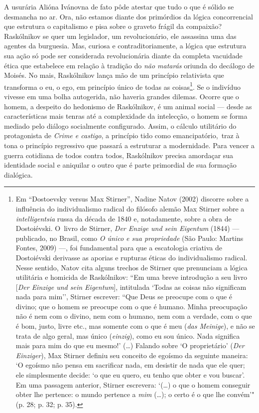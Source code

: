 A usurária Alióna Ivánovna de fato pôde atestar que tudo o que é sólido
se desmancha no ar. Ora, não estamos diante dos primórdios da lógica
concorrencial que estrutura o capitalismo e pisa sobre o graveto frágil
da compaixão? Raskólnikov se quer um legislador, um revolucionário, ele
assassina uma das agentes da burguesia. Mas, curiosa e
contraditoriamente, a lógica que estrutura sua ação só pode ser
considerada revolucionária diante da completa vacuidade ética que
estabelece em relação à tradição do \emph{não matarás} oriunda do
decálogo de Moisés. No mais, Raskólnikov lança mão de um princípio
relativista que transforma o eu, o ego, em princípio único de todas as
coisas\footnote{Em ``Dostoevsky versus Max Stirner'', Nadine Natov
  (2002) discorre sobre a influência do individualismo radical do
  filósofo alemão Max Stirner sobre a \emph{intelligentsia} russa da
  década de 1840 e, notadamente, sobre a obra de Dostoiévski. O~livro de
  Stirner, \emph{Der Enzige und sein Eigentum} (1844) --- publicado, no
  Brasil, como \emph{O único e sua propriedade} (São Paulo: Martins
  Fontes, 2009) ---, foi fundamental para que a escatologia criativa de
  Dostoiévski derivasse as aporias e rupturas éticas do individualismo
  radical. Nesse sentido, Natov cita alguns trechos de Stirner que
  prenunciam a lógica utilitária e homicida de Raskólnikov: ``Em uma
  breve introdução a seu livro {[}\emph{Der Einzige und sein
  Eigentum}{]}, intitulada `Todas as coisas não significam nada para
  mim'', Stirner escrever: ``Que Deus se preocupe com o que é divino;
  que o homem se preocupe com o que é humano. Minha preocupação não é
  nem com o divino, nem com o humano, nem com a verdade, com o que é
  bom, justo, livre etc., mas somente com o que é meu (\emph{das
  Meinige}), e não se trata de algo geral, mas único (\emph{einzig}),
  como eu sou único. Nada significa mais para mim do que eu mesmo!'
  (\ldots) Falando sobre `O proprietário' (\emph{Der Einziger}), Max
  Stirner definiu seu conceito de egoísmo da seguinte maneira: `O
  egoísmo não pensa em sacrificar nada, em desistir de nada que ele
  quer; ele simplesmente decide: `o que eu quero, eu tenho que obter e
  vou buscar'. Em uma passagem anterior, Stirner escrevera: `(\ldots) o que
  o homem conseguir obter lhe pertence: o mundo pertence a \emph{mim}
  (\ldots); o certo é o que lhe convém'" (p. 28; p. 32; p. 35).}. Se o
indivíduo vivesse em uma bolha autogerida, não haveria grandes dilemas.
Ocorre que o homem, a despeito do hedonismo de Raskólnikov, é um animal
social --- desde as características mais tenras até a complexidade da
intelecção, o homem se forma mediado pelo diálogo socialmente
configurado. Assim, o cálculo utilitário do protagonista de \emph{Crime
e castigo}, a princípio tido como emancipatório,~traz à tona o princípio
regressivo que passará a estruturar a modernidade. Para vencer a guerra
cotidiana de todos contra todos, Raskólnikov precisa amordaçar sua
identidade social e aniquilar o outro que é parte primordial de sua
formação dialógica.

